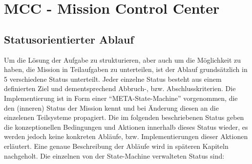 \chapter{MCC - Mission Control Center}\label{MCC - Mission Control Center}

\section{Statusorientierter Ablauf}

Um die Lösung der Aufgabe zu strukturieren, aber auch um die Möglichkeit zu haben, die Mission in Teilaufgaben zu unterteilen, ist der Ablauf grundsätzlich in 5 verschiedene Status unterteilt. Jeder einzelne Status besteht aus einem definierten Ziel und dementsprechend Abbruch-, bzw. Abschlusskriterien. Die Implementierung ist in Form einer ``META-State-Machine'' vorgenommen, die den (inneren) Status der Mission kennt und bei Änderung diesen an die einzelenen Teilsysteme propagiert. Die im folgenden beschriebenen Status geben die konzeptionellen Bedingungen und Aktionen innerhalb dieses Status wieder, es werden jedoch keine konkreten Abläufe, bzw. Implementierungen dieser Aktionen erläutert. Eine genaue Beschreibung der Abläufe wird in späteren Kapiteln nachgeholt. Die einzelnen von der State-Machine verwalteten Status sind:

